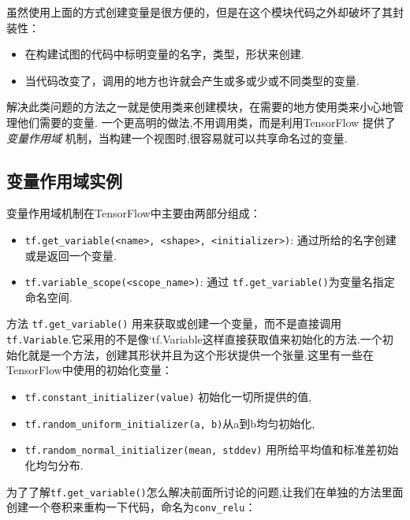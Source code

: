 虽然使用上面的方式创建变量是很方便的，但是在这个模块代码之外却破坏了其封装性：

\begin{itemize}
\tightlist
\item
  在构建试图的代码中标明变量的名字，类型，形状来创建.
\item
  当代码改变了，调用的地方也许就会产生或多或少或不同类型的变量.
\end{itemize}

解决此类问题的方法之一就是使用类来创建模块，在需要的地方使用类来小心地管理他们需要的变量.
一个更高明的做法,不用调用类，而是利用TensorFlow 提供了\emph{变量作用域}
机制，当构建一个视图时,很容易就可以共享命名过的变量.

\subsection{变量作用域实例}\label{ux53d8ux91cfux4f5cux7528ux57dfux5b9eux4f8b}

变量作用域机制在TensorFlow中主要由两部分组成：

\begin{itemize}
\tightlist
\item
  \texttt{tf.get\_variable(\textless{}name\textgreater{},\ \textless{}shape\textgreater{},\ \textless{}initializer\textgreater{})}:
  通过所给的名字创建或是返回一个变量.
\item
  \texttt{tf.variable\_scope(\textless{}scope\_name\textgreater{})}:
  通过 \texttt{tf.get\_variable()}为变量名指定命名空间.
\end{itemize}

方法 \texttt{tf.get\_variable()}
用来获取或创建一个变量，而不是直接调用\texttt{tf.Variable}.它采用的不是像`tf.Variable这样直接获取值来初始化的方法.一个初始化就是一个方法，创建其形状并且为这个形状提供一个张量.这里有一些在TensorFlow中使用的初始化变量：

\begin{itemize}
\tightlist
\item
  \texttt{tf.constant\_initializer(value)} 初始化一切所提供的值,
\item
  \texttt{tf.random\_uniform\_initializer(a,\ b)}从a到b均匀初始化,
\item
  \texttt{tf.random\_normal\_initializer(mean,\ stddev)}
  用所给平均值和标准差初始化均匀分布.
\end{itemize}

为了了解\texttt{tf.get\_variable()}怎么解决前面所讨论的问题,让我们在单独的方法里面创建一个卷积来重构一下代码，命名为\texttt{conv\_relu}：

